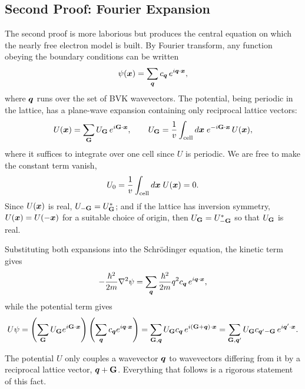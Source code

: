\subsection{Second Proof: Fourier Expansion}

The second proof is more laborious but produces the central equation on which the nearly free electron model is built. By Fourier transform, any function obeying the boundary conditions can be written
\begin{equation}
    \psi(\bm{x}) = \sum_{\bm{q}} c_{\bm{q}}\, e^{i\bm{q}\cdot\bm{x}},
\end{equation}
where $\bm{q}$ runs over the set of BVK wavevectors. The potential, being periodic in the lattice, has a plane-wave expansion containing only reciprocal lattice vectors:
\begin{equation}
    U(\lvect{x}) = \sum_{\cvect{G}} U_{\cvect{G}}\, e^{i\cvect{G}\cdot\lvect{x}},
    \qquad
    U_{\cvect{G}} = \frac{1}{v}\int_{\text{cell}} d\lvect{x}\; e^{-i\cvect{G}\cdot\lvect{x}}\, U(\lvect{x}),
\end{equation}
where it suffices to integrate over one cell since $U$ is periodic. We are free to make the constant term vanish,
\begin{equation}
    U_0 = \frac{1}{v}\int_{\text{cell}} d\bm{x}\; U(\bm{x}) = 0.
\end{equation}
Since $U(\bm{x})$ is real, $U_{-\cvect{G}} = U^*_{\cvect{G}}$; and if the lattice has inversion symmetry, $U(\bm{x}) = U(-\bm{x})$ for a suitable choice of origin, then $U_{\cvect{G}} = U^*_{-\cvect{G}}$ so that $U_{\cvect{G}}$ is real.

Substituting both expansions into the Schrödinger equation, the kinetic term gives
\begin{equation}
    -\frac{\hbar^2}{2m}\nabla^2 \psi = \sum_{\bm{q}} \frac{\hbar^2}{2m} q^2 c_{\bm{q}}\, e^{i\bm{q}\cdot\bm{x}},
\end{equation}
while the potential term gives
\begin{equation}
    U\psi = \left( \sum_{\cvect{G}} U_{\cvect{G}} e^{i\cvect{G}\cdot\lvect{x}} \right)\left( \sum_{\lvect{q}} c_{\lvect{q}} e^{i\lvect{q}\cdot\lvect{x}} \right)
    = \sum_{\cvect{G},\lvect{q}} U_{\cvect{G}} c_{\lvect{q}}\, e^{i(\cvect{G}+\lvect{q})\cdot\lvect{x}}
    = \sum_{\cvect{G},\lvect{q}'} U_{\cvect{G}} c_{\lvect{q}'-\cvect{G}}\, e^{i\lvect{q}'\cdot\lvect{x}}.
\end{equation}

\begin{fact}
The potential $U$ only couples a wavevector $\bm{q}$ to wavevectors differing from it by a reciprocal lattice vector, $\lvect{q}+\cvect{G}$. Everything that follows is a rigorous statement of this fact.
\end{fact}

